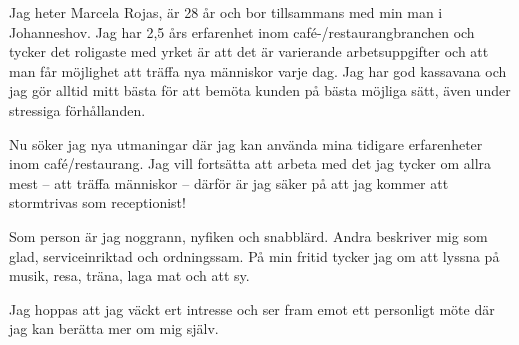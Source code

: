 \documentclass[11pt,a4paper,sans]{moderncv}        %
\begin{document}
Jag heter Marcela Rojas, är 28 år och bor tillsammans med min man i Johanneshov. Jag har 2,5 års erfarenhet inom café-/restaurangbranchen och tycker det roligaste med yrket är att det är varierande arbetsuppgifter och att man får möjlighet att träffa nya människor varje dag. Jag har god kassavana och jag gör alltid mitt bästa för att bemöta kunden på bästa möjliga sätt, även under stressiga förhållanden.

Nu söker jag nya utmaningar där jag kan använda mina tidigare erfarenheter inom café/restaurang. Jag vill fortsätta att arbeta med det jag tycker om allra mest -- att träffa människor -- därför är jag säker på att jag kommer att stormtrivas som receptionist!

Som person är jag noggrann, nyfiken och snabblärd. Andra beskriver mig som glad, serviceinriktad och ordningssam. På min fritid tycker jag om att lyssna på musik, resa, träna, laga mat och att sy.

Jag hoppas att jag väckt ert intresse och ser fram emot ett personligt möte där jag kan berätta mer om mig själv.

\makeletterclosing

\end{document}
